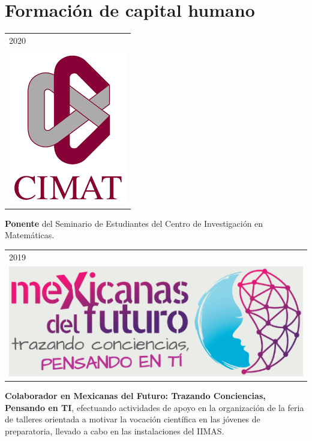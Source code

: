 \documentclass[]{friggeri-cv}
\begin{document}
\section{Formación de capital humano}
\vspace{-0.4cm}
\begin{entrylist}
	\entry
     {   \begin{tabular}{l}
    		\hspace{0.9cm}2020\\
     		\hspace{0.5cm}\includegraphics[scale=0.2]{img/cimat.png}
	\end{tabular}
    }
    {\vspace{-1.4cm}}
    { }
    {\textbf{Ponente} del Seminario de Estudiantes del Centro de Investigación en Matemáticas.}
    \entry
     {   \begin{tabular}{l}
    		\hspace{0.9cm}2019\\
     		\includegraphics[scale=0.15]{img/mexicanas.png}
	\end{tabular}
    }
    {\vspace{-0.99cm}}
    { }
    {\textbf{Colaborador en Mexicanas del Futuro: Trazando Conciencias, Pensando en TI}, efectuando actividades de apoyo en la organización de la feria de talleres orientada a motivar la vocación científica en las jóvenes de preparatoria, llevado a cabo en las instalaciones del IIMAS.}

\end{entrylist}
\end{document}
